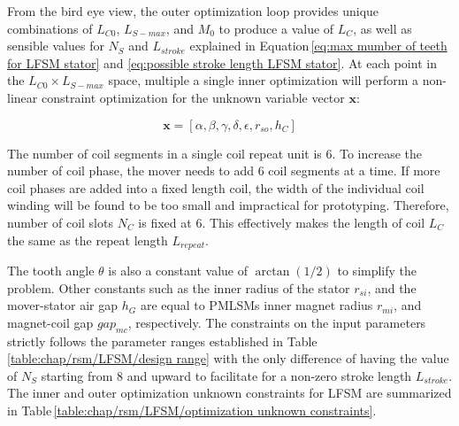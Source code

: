                 
                From the bird eye view, the outer optimization loop provides unique combinations of $L_{C0}$, $L_{S-max}$, and $M_0$ to produce a value of $L_C$, as well as sensible values for $N_S$ and $L_{stroke}$ explained in Equation\,\ref{eq:max mumber of teeth for LFSM stator} and \ref{eq:possible stroke length LFSM stator}. At each point in the $L_{C0} \times L_{S-max}$ space, multiple a single inner optimization will perform a non-linear constraint optimization for the unknown variable vector $\textbf{x}$:
            
            
                \begin{equation}
                    \textbf{x} = \left[ \alpha,\beta,\gamma,\delta,\epsilon,r_{so},h_{C} \right]
                    \label{eq:inner optimization x of FSM}
                \end{equation}
                
                
                The number of coil segments in a single coil repeat unit is 6. To increase the number of coil phase, the mover needs to add 6 coil segments at a time. If more coil phases are added into a fixed length coil, the width of the individual coil winding will be found to be too small and impractical for prototyping. Therefore, number of coil slots $N_C$ is fixed at $6$. This effectively makes the length of coil $L_C$ the same as the repeat length $L_{repeat}$. 
                
                
                The tooth angle $\theta$ is also a constant value of $\arctan(1/2)$ to simplify the problem. Other constants such as the inner radius of the stator $r_{si}$, and the mover-stator air gap $h_G$ are equal to \acsp{PMLSM} inner magnet radius $r_{mi}$, and magnet-coil gap $gap_{mc}$, respectively. The constraints on the input parameters strictly follows the parameter ranges established in Table\,\ref{table:chap/rsm/LFSM/design range} with the only difference of having the value of $N_S$ starting from $8$ and upward to facilitate for a non-zero stroke length $L_{stroke}$. The inner and outer optimization unknown constraints for \acs{LFSM} are summarized in Table\,\ref{table:chap/rsm/LFSM/optimization unknown constraints}.
                
